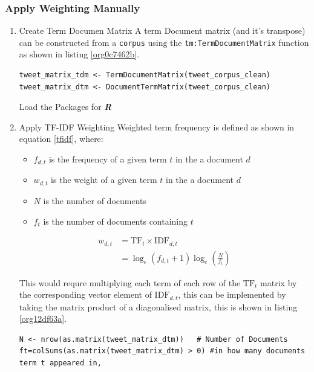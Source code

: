 \documentclass[11pt]{article}
\begin{document}
\subsubsection{Apply Weighting Manually}
\label{sec:orgcc5df4b}
\begin{enumerate}
\item Create Term Documen Matrix
\label{sec:orgb8dd6f5}
A term Document matrix (and it's transpose) can be constructed from a \texttt{corpus} using the
\texttt{tm:TermDocumentMatrix} function as shown in listing \ref{org0c7462b}.

\begin{listing}[htbp]
\begin{verbatim}
tweet_matrix_tdm <- TermDocumentMatrix(tweet_corpus_clean)
tweet_matrix_dtm <- DocumentTermMatrix(tweet_corpus_clean)
\end{verbatim}
\caption{\label{org0c7462b}Load the Packages for \textbf{\textbf{\emph{R}}}}
\end{listing}

\item Apply TF-IDF Weighting
\label{sec:org49c40c3}
Weighted term frequency is defined as shown in equation \eqref{tfidf}, where:

\begin{itemize}
\item \(f_{d,t}\) is the frequency of a given term \(t\) in the a document \(d\)
\item \(w_{d,t}\) is the weight of a given term \(t\) in the a document \(d\)
\item \(N\) is the number of documents
\item \(f_{t}\) is the number of documents containing \(t\)
\end{itemize}

\begin{equation}\begin{aligned}
w_{d, t} &=\mathrm{TF}_{t} \times \mathrm{IDF}_{d, t} \\
&=\log _{e}\left(f_{d, t}+1\right) \log _{e}\left(\frac{N}{f_{t}}\right) \label{tfidf}
\end{aligned}\end{equation}

This would requre multiplying each term of each row of the \(\mathrm{TF}_{t}\) matrix by the corresponding vector element of \(\mathrm{IDF}_{d,t}\), this can be implemented by taking the matrix product of a diagonalised matrix, this is shown in listing \ref{org12df63a}.

\begin{listing}[htbp]
\begin{verbatim}
N <- nrow(as.matrix(tweet_matrix_dtm))   # Number of Documents
ft=colSums(as.matrix(tweet_matrix_dtm) > 0) #in how many documents term t appeared in,


\end{verbatim}
\end{listing}
\end{enumerate}
\end{document}
